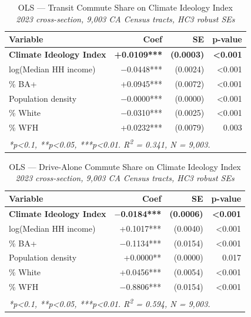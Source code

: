 \documentclass[12pt]{article}
\begin{document}
\begin{table}[H]
\centering
\caption{OLS --- Transit Commute Share on Climate Ideology Index\\
\small\textit{2023 cross-section, 9,003 CA Census tracts, HC3 robust SEs}}
\begin{tabular}{lrrr}
\toprule
Variable & Coef & SE & p-value \\
\midrule
\textbf{Climate Ideology Index} & \textbf{+0.0109***} & \textbf{(0.0003)} & \textbf{<0.001} \\
log(Median HH income)           & $-$0.0448***        & (0.0024)          & <0.001 \\
\% BA+                          & +0.0945***          & (0.0072)          & <0.001 \\
Population density              & $-$0.0000***        & (0.0000)          & <0.001 \\
\% White                        & $-$0.0310***        & (0.0025)          & <0.001 \\
\% WFH                          & +0.0232***          & (0.0079)          & 0.003  \\
\bottomrule
\multicolumn{4}{l}{\footnotesize \textit{*p<0.1, **p<0.05, ***p<0.01. R\textsuperscript{2} = 0.341, N = 9,003.}} \\
\end{tabular}
\end{table}

\begin{table}[H]
\centering
\caption{OLS --- Drive-Alone Commute Share on Climate Ideology Index\\
\small\textit{2023 cross-section, 9,003 CA Census tracts, HC3 robust SEs}}
\begin{tabular}{lrrr}
\toprule
Variable & Coef & SE & p-value \\
\midrule
\textbf{Climate Ideology Index} & \textbf{$-$0.0184***} & \textbf{(0.0006)} & \textbf{<0.001} \\
log(Median HH income)           & +0.1017***             & (0.0040)           & <0.001 \\
\% BA+                          & $-$0.1134***           & (0.0154)           & <0.001 \\
Population density              & +0.0000**              & (0.0000)           & 0.017  \\
\% White                        & +0.0456***             & (0.0054)           & <0.001 \\
\% WFH                          & $-$0.8806***           & (0.0154)           & <0.001 \\
\bottomrule
\multicolumn{4}{l}{\footnotesize \textit{*p<0.1, **p<0.05, ***p<0.01. R\textsuperscript{2} = 0.594, N = 9,003.}} \\
\end{tabular}
\end{table}
\end{document}
